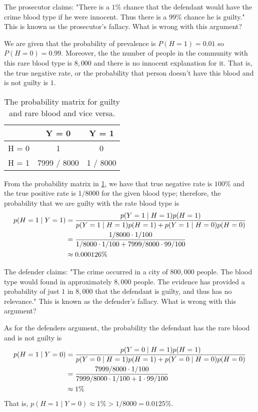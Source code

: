 \begin{exercise}
	\begin{exercise}
		\item
			The prosecutor claims: "There is a \(1\%\) chance that the defendant would have the crime blood type if he
			were innocent. Thus there is a \(99\%\) chance he is guilty." This is known as the prosecutor's fallacy.
			What is wrong with this argument?
			\par\smallskip
			We are given that the probability of prevalence is \(P(H = 1) = 0.01\) so \(P(H = 0) = 0.99\). Moreover, the
			the number of people in the community with this rare blood type is \(8,000\) and there is no innocent
			explanation for it. That is, the true negative rate, or the probability that person doesn't have this blood
			and is not guilty is \(1\).
			\begin{table}
			\centering
				\begin{tabular}{l | c c}
					& Y = 0 & Y = 1\\ \hline
					H = 0 & 1 & 0\\
					H = 1 & 7999 / 8000 & 1 / 8000
				\end{tabular}
				\caption{The probability matrix for guilty and rare blood and vice versa.}
				\label{ch2_ex21}
			\end{table}
			From the probability matrix in \cref{ch2_ex21}, we have that true negative rate is \(100\%\) and the true 
			positive rate is \(1 / 8000\) for the given blood type; therefore, the probability that we are guilty with the
			rate blood type is
			\begin{align}
				p(H = 1\mid Y = 1) 
				&= \frac{p(Y = 1\mid H = 1) p(H = 1)}{p(Y = 1\mid H = 1) p(H = 1) + p(Y = 1\mid H = 0) p(H = 0)}
				\notag\\
				&= \frac{1 / 8000\cdot 1 / 100}{1 / 8000\cdot 1 / 100 + 7999 / 8000 \cdot 99 / 100}\notag\\
				&\approx 0.000126\%\notag
			\end{align}
		\item
			The defender claims: "The crime occurred in a city of \(800,000\) people. The blood type would found in
			approximately \(8,000\) people. The evidence has provided a probability of just \(1\) in \(8,000\) that the
			defendant is guilty, and thus has no relevance." This is known as the defender's fallacy. 
			What is wrong with this argument?
			\par\smallskip
			As for the defenders argument, the probability the defendant has the rare blood and is not guilty is
			\begin{align}
				p(H = 1\mid Y = 0) 
				&= \frac{p(Y = 0\mid H = 1) p(H = 1)}{p(Y = 0\mid H = 1) p(H = 1) + p(Y = 0\mid H = 0) p(H = 0)}
				\notag\\
				&= \frac{7999 / 8000\cdot 1 / 100}{7999 / 8000\cdot 1 / 100 + 1 \cdot 99 / 100}\notag\\
				&\approx 1\%\notag
			\end{align}
			That is, \(p(H = 1\mid Y = 0) \approx 1\% > 1 / 8000 = 0.0125\%\).
	\end{exercise}
\end{exercise}

